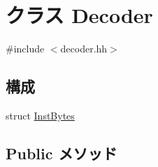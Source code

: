 \hypertarget{classX86ISA_1_1Decoder}{
\section{クラス Decoder}
\label{classX86ISA_1_1Decoder}
}


{\ttfamily \#include $<$decoder.hh$>$}\subsection*{構成}
\begin{DoxyCompactItemize}
\item 
struct \hyperlink{structX86ISA_1_1Decoder_1_1InstBytes}{InstBytes}
\end{DoxyCompactItemize}
\subsection*{Public メソッド}
